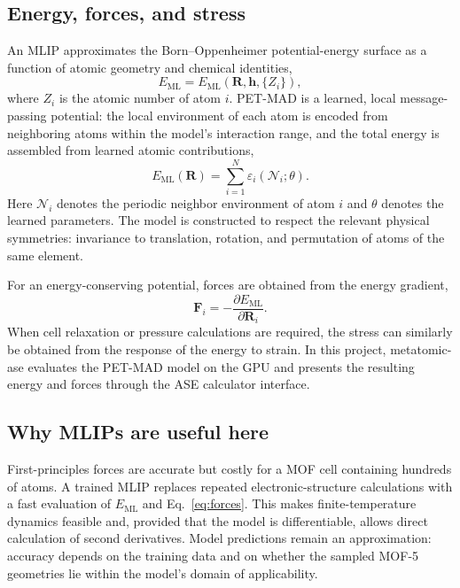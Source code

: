 \documentclass[11pt,a4paper]{article}
\begin{document}
\subsection{Energy, forces, and stress}

An MLIP approximates the Born--Oppenheimer potential-energy surface as a function of atomic geometry and chemical identities,
\begin{equation}
  E_{\mathrm{ML}} = E_{\mathrm{ML}}(\bm{R}, \bm{h}, \{Z_i\}),
\end{equation}
where $Z_i$ is the atomic number of atom $i$. PET-MAD is a learned, local message-passing potential: the local environment of each atom is encoded from neighboring atoms within the model's interaction range, and the total energy is assembled from learned atomic contributions,
\begin{equation}
  E_{\mathrm{ML}}(\bm{R}) = \sum_{i=1}^{N} \varepsilon_i(\mathcal{N}_i; \theta).
\end{equation}
Here $\mathcal{N}_i$ denotes the periodic neighbor environment of atom $i$ and $\theta$ denotes the learned parameters. The model is constructed to respect the relevant physical symmetries: invariance to translation, rotation, and permutation of atoms of the same element.

For an energy-conserving potential, forces are obtained from the energy gradient,
\begin{equation}
  \bm{F}_i = -\frac{\partial E_{\mathrm{ML}}}{\partial \bm{R}_i}.
  \label{eq:forces}
\end{equation}
When cell relaxation or pressure calculations are required, the stress can similarly be obtained from the response of the energy to strain. In this project, metatomic-ase evaluates the PET-MAD model on the GPU and presents the resulting energy and forces through the ASE calculator interface.

\subsection{Why MLIPs are useful here}

First-principles forces are accurate but costly for a MOF cell containing hundreds of atoms. A trained MLIP replaces repeated electronic-structure calculations with a fast evaluation of $E_{\mathrm{ML}}$ and Eq.~\eqref{eq:forces}. This makes finite-temperature dynamics feasible and, provided that the model is differentiable, allows direct calculation of second derivatives. Model predictions remain an approximation: accuracy depends on the training data and on whether the sampled MOF-5 geometries lie within the model's domain of applicability.
\end{document}
